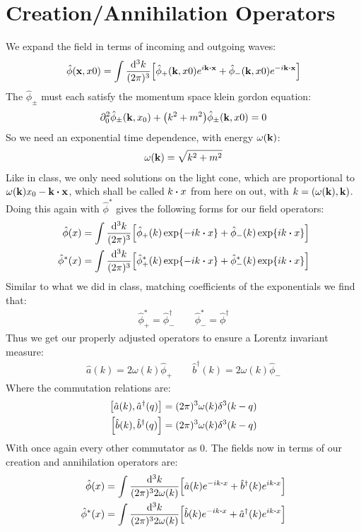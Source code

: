 \documentclass[12pt]{article}
\newcommand{\D}{\partial}
\newcommand{\phih}{\hat{\phi}}
\newcommand{\phish}{\hat{\phi}^*}
\newcommand{\ahat}{\hat{a}}
\newcommand{\ahatd}{\hat{a}^\dag}
\newcommand{\bhat}{\hat{b}}
\newcommand{\bhatd}{\hat{b}^\dag}
\newcommand{\intk}{\int\frac{\dd[3]{k}}{(2\pi)^32\omega(k)}}
\begin{document}
\section{Creation/Annihilation Operators}
We expand the field in terms of incoming and outgoing waves:
\begin{align*}
  \phih(\vb{x},x0)=\int\frac{\dd[3]{k}}{(2\pi)^3}
  \qty[\phih_+(\vb{k},x0)e^{i\vb{k}\vdot\vb{x}}+
  \phih_-(\vb{k},x0)e^{-i\vb{k}\vdot\vb{x}}]
\end{align*}
The $\phih_\pm$ must each satisfy the momentum space klein gordon equation:
\begin{align*}
  \D_0^2\phih_\pm(\vb{k},x_0)+\qty(k^2+m^2)\phih_\pm(\vb{k},x0)=0
\end{align*}
So we need an exponential time dependence, with energy $\omega(\vb{k})$:
\begin{align*}
  \omega(\vb{k})=\sqrt{k^2+m^2}
\end{align*}
Like in class, we only need solutions on the light cone, which are proportional to $\omega(\vb{k})x_0-\vb{k}\vdot\vb{x}$, which shall be called $k\vdot x$ from here on out, with $k=(\omega(\vb{k}),\vb{k})$. Doing this again with $\phish$ gives the following forms for our field operators:
\begin{align*}
  \phih(x)&=\int\frac{\dd[3]{k}}{(2\pi)^3}
  \qty[\phih_+(k)\exp{-ik\vdot x}+\phih_-(k)\exp{ik\vdot x}]\\
  \phish(x)&=\int\frac{\dd[3]{k}}{(2\pi)^3}
  \qty[\phish_+(k)\exp{-ik\vdot x}+\phish_-(k)\exp{ik\vdot x}]
\end{align*}
Similar to what we did in class, matching coefficients of the exponentials we find that:
\begin{align*}
  \phish_+=\phih^\dag_-\qquad\phish_-=\phih^\dag
\end{align*}
Thus we get our properly adjusted operators to ensure a Lorentz invariant measure:
\begin{align*}
  \ahat(k)=2\omega(k)\phih_+\qquad\bhatd(k)=2\omega(k)\phih_-
\end{align*}
Where the commutation relations are:
\begin{align*}
  \comm{\ahat(k)}{\ahatd(q)}&=(2\pi)^3\omega(k)\delta^3(k-q)\\
  \comm{\bhat(k)}{\bhatd(q)}&=(2\pi)^3\omega(k)\delta^3(k-q)
\end{align*}
With once again every other commutator as 0. The fields now in terms of our creation and annihilation operators are:
\begin{align*}
  \phih(x)&=\intk\qty[\ahat(k)e^{-ik\vdot x}+\bhatd(k)e^{ik\vdot x}]\\
  \phish(x)&=\intk\qty[\bhat(k)e^{-ik\vdot x}+\ahatd(k)e^{ik\vdot x}]
\end{align*}
\end{document}
